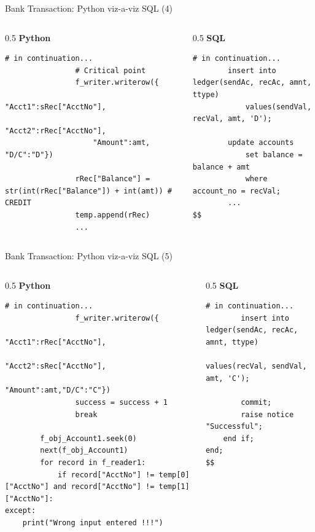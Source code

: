 \documentclass[aspectratio=169, xcolor=dvipsnames]{beamer}
\begin{document}
\begin{frame}[fragile]{Bank Transaction: Python viz-a-viz SQL (4)}
    \begin{columns}[T]
        \begin{column}{0.5\textwidth}
            \textbf{Python}
            \begin{verbatim}
# in continuation...
                # Critical point
                f_writer.writerow({
                    "Acct1":sRec["AcctNo"],
                    "Acct2":rRec["AcctNo"],
                    "Amount":amt, "D/C":"D"})
                
                rRec["Balance"] = str(int(rRec["Balance"]) + int(amt)) # CREDIT
                temp.append(rRec)
                ...
            \end{verbatim}
        \end{column}
        \begin{column}{0.5\textwidth}
            \textbf{SQL}
            \begin{verbatim}
# in continuation...
        insert into ledger(sendAc, recAc, amnt, ttype) 
            values(sendVal, recVal, amt, 'D');
            
        update accounts 
            set balance = balance + amt 
            where account_no = recVal;
        ...
$$
            \end{verbatim}
        \end{column}
    \end{columns}
\end{frame}

\begin{frame}[fragile]{Bank Transaction: Python viz-a-viz SQL (5)}
    \begin{columns}[T]
        \begin{column}{0.5\textwidth}
            \textbf{Python}
            \begin{verbatim}
# in continuation...
                f_writer.writerow({
                    "Acct1":rRec["AcctNo"],
                    "Acct2":sRec["AcctNo"],
                    "Amount":amt,"D/C":"C"})
                success = success + 1
                break
                
        f_obj_Account1.seek(0)
        next(f_obj_Account1)
        for record in f_reader1:
            if record["AcctNo"] != temp[0]["AcctNo"] and record["AcctNo"] != temp[1]["AcctNo"]:
except: 
    print("Wrong input entered !!!")
            \end{verbatim}
        \end{column}
        \begin{column}{0.5\textwidth}
            \textbf{SQL}
            \begin{verbatim}
# in continuation...
        insert into ledger(sendAc, recAc, amnt, ttype) 
            values(recVal, sendVal, amt, 'C');
            
        commit;
        raise notice "Successful";
    end if;
end;
$$
            \end{verbatim}
        \end{column}
    \end{columns}
\end{frame}
\end{document}
